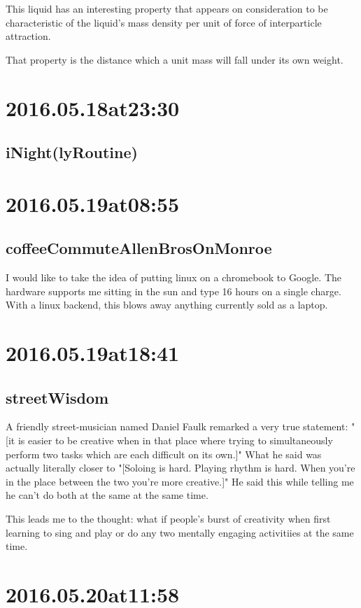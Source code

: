 This liquid has an interesting property that appears on consideration to be characteristic of the liquid's mass density per unit of force of interparticle attraction.

That property is the distance which a unit mass will fall under its own weight.

\section*{ 2016.05.18at23:30 }
\subsection*{iNight(lyRoutine)}

\section*{ 2016.05.19at08:55 }
\subsection*{coffeeCommuteAllenBrosOnMonroe}
I would like to take the idea of putting linux on a chromebook to Google. The hardware supports me sitting in the sun and type 16 hours on a single charge. With a linux backend, this blows away anything currently sold as a laptop.

\section*{ 2016.05.19at18:41 }
\subsection*{streetWisdom}
A friendly street-musician named Daniel Faulk remarked a very true statement: "[it is easier to be creative when in that place where trying to simultaneously perform two tasks which are each difficult on its own.]" What he said was actually literally closer to "[Soloing is hard. Playing rhythm is hard. When you're in the place between the two you're more creative.]" He said this while telling me he can't do both at the same at the same time.

This leads me to the thought: what if people's burst of creativity when first learning to sing and play or do any two mentally engaging activitiies at the same time.

\section*{ 2016.05.20at11:58 }
